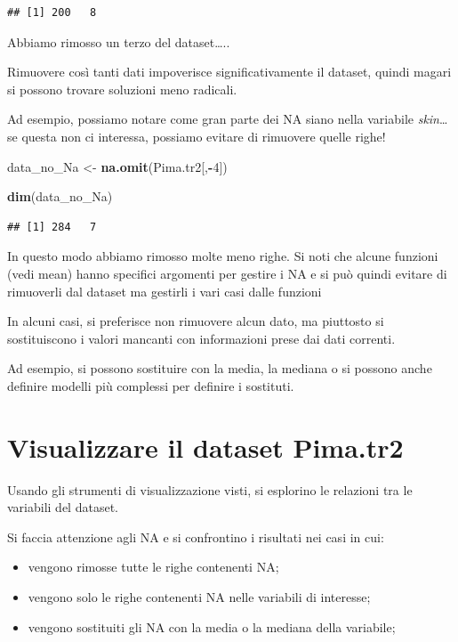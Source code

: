 \documentclass[]{book}
\newenvironment{Shaded}{\begin{snugshade}}{\end{snugshade}}
\newcommand{\DecValTok}[1]{\textcolor[rgb]{0.00,0.00,0.81}{#1}}
\newcommand{\KeywordTok}[1]{\textcolor[rgb]{0.13,0.29,0.53}{\textbf{#1}}}
\newcommand{\NormalTok}[1]{#1}
\newcommand{\OperatorTok}[1]{\textcolor[rgb]{0.81,0.36,0.00}{\textbf{#1}}}
\newcommand{\StringTok}[1]{\textcolor[rgb]{0.31,0.60,0.02}{#1}}
\providecommand{\tightlist}{%
  \setlength{\itemsep}{0pt}\setlength{\parskip}{0pt}}
\begin{document}
\begin{verbatim}
## [1] 200   8
\end{verbatim}

Abbiamo rimosso un terzo del dataset\ldots{}..

Rimuovere così tanti dati impoverisce significativamente il dataset, quindi magari si possono trovare soluzioni meno radicali.

Ad esempio, possiamo notare come gran parte dei NA siano nella variabile \emph{skin}\ldots{} se questa non ci interessa, possiamo evitare di rimuovere quelle righe!

\begin{Shaded}
\begin{Highlighting}[]
\NormalTok{data_no_Na <-}\StringTok{ }\KeywordTok{na.omit}\NormalTok{(Pima.tr2[,}\OperatorTok{-}\DecValTok{4}\NormalTok{])}

\KeywordTok{dim}\NormalTok{(data_no_Na)}
\end{Highlighting}
\end{Shaded}

\begin{verbatim}
## [1] 284   7
\end{verbatim}

In questo modo abbiamo rimosso molte meno righe.
Si noti che alcune funzioni (vedi mean) hanno specifici argomenti per gestire i NA e si può quindi evitare di rimuoverli dal dataset ma gestirli i vari casi dalle funzioni

In alcuni casi, si preferisce non rimuovere alcun dato, ma piuttosto si sostituiscono i valori mancanti con informazioni prese dai dati correnti.

Ad esempio, si possono sostituire con la media, la mediana o si possono anche definire modelli più complessi per definire i sostituti.

\hypertarget{visualizzare-il-dataset-pima.tr2}{%
\section{Visualizzare il dataset Pima.tr2}\label{visualizzare-il-dataset-pima.tr2}}

Usando gli strumenti di visualizzazione visti, si esplorino le relazioni tra le variabili del dataset.

Si faccia attenzione agli NA e si confrontino i risultati nei casi in cui:

\begin{itemize}
\tightlist
\item
  vengono rimosse tutte le righe contenenti NA;
\item
  vengono solo le righe contenenti NA nelle variabili di interesse;
\item
  vengono sostituiti gli NA con la media o la mediana della variabile;
\end{itemize}
\end{document}
